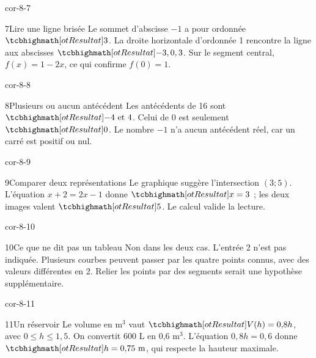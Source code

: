 \begin{blocLivre}{cor-8-7}\begin{corrige}{7}{Lire une ligne brisée}
Le sommet d’abscisse $-1$ a pour ordonnée $\res3$. La droite horizontale d’ordonnée 1 rencontre la ligne aux abscisses $\res{-3,0,3}$. Sur le segment central, $f(x)=1-2x$, ce qui confirme $f(0)=1$.
\label{fig-cor-8-7}
\end{corrige}\end{blocLivre}
\begin{blocLivre}{cor-8-8}\begin{corrige}{8}{Plusieurs ou aucun antécédent}
Les antécédents de 16 sont $\res{-4\text{ et }4}$. Celui de 0 est seulement $\res0$. Le nombre $-1$ n’a aucun antécédent réel, car un carré est positif ou nul.
\label{fig-cor-8-8}
\end{corrige}\end{blocLivre}
\begin{blocLivre}{cor-8-9}\begin{corrige}{9}{Comparer deux représentations}
Le graphique suggère l’intersection $(3;5)$. L’équation $x+2=2x-1$ donne $\res{x=3}$ ; les deux images valent $\res5$. Le calcul valide la lecture.
\label{fig-cor-8-9}
\end{corrige}\end{blocLivre}
\begin{blocLivre}{cor-8-10}\begin{corrige}{10}{Ce que ne dit pas un tableau}
Non dans les deux cas. L’entrée 2 n’est pas indiquée. Plusieurs courbes peuvent passer par les quatre points connus, avec des valeurs différentes en 2. Relier les points par des segments serait une hypothèse supplémentaire.
\end{corrige}\end{blocLivre}
\begin{blocLivre}{cor-8-11}\begin{corrige}{11}{Un réservoir}
Le volume en m$^3$ vaut $\res{V(h)=0{,}8h}$, avec $0\le h\le1{,}5$. On convertit 600 L en 0,6 m$^3$. L’équation $0{,}8h=0{,}6$ donne $\res{h=0{,}75\text{ m}}$, qui respecte la hauteur maximale.
\label{fig-cor-8-11}
\end{corrige}\end{blocLivre}
